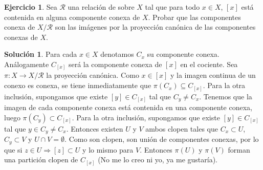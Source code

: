 \documentclass{article}
\theoremstyle{plain}
\theoremstyle{definition}
\newtheorem{exercise}{Ejercicio}
\newtheorem*{sol*}{Solución}
\begin{document}
\newpage
\begin{exercise}
Sea $\mathcal{R}$ una relación de sobre $X$ tal que para todo $x \in X$, $[x]$ está contenida en alguna componente conexa de $X$. Probar que las componentes conexa de $X/\mathcal{R}$ son las imágenes por la proyección canónica de las componentes conexas de $X$.
\end{exercise}
\begin{sol*}
Para cada $x\in X$ denotamos $C_x$ su componente conexa. Análogamente $C_{[x]}$ será la componente conexa de $[x]$ en el cociente. Sea $\pi:X\to X/\mathcal{R}$ la proyección canónica. Como $x\in [x]$ y la imagen continua de un conexo es conexa, se tiene inmediatamente que $\pi(C_x)\subseteq C_{[x]}$.
Para la otra inclusión, supongamos que existe $[y]\in C_{[x]}$ tal que $C_y\neq C_x$. Tenemos que la imagen de cada componente conexa está contenida en una componente conexa, luego $\pi(C_y)\subset C_{[x]}$. Para la otra inclusión, supongamos que existe $[y]\in C_{[x]}$ tal 	que $y\in C_y\neq C_x$. Entonces existen $U$ y $V$ ambos clopen tales que $C_x\subset U$, $C_y\subset V$ y $U\cap V=\emptyset$. Como son clopen, son unión de componentes conexas, por lo que si $z\in U\Rightarrow [z]\subset U$ y lo mismo para $V$. Entonces $\pi(U)$ y $\pi(V)$ forman una partición clopen de $C_{[x]}$ (No me lo creo ni yo, ya me gustaría).
\end{sol*}
\end{document}
